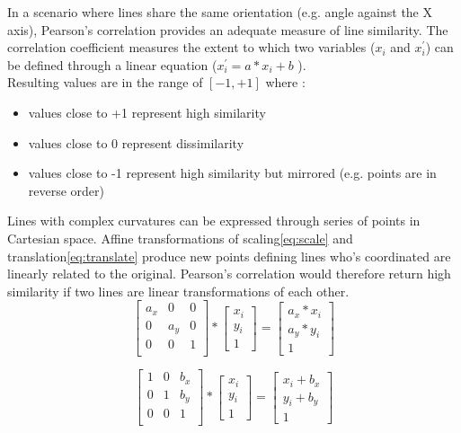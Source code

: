 \documentclass[
    floatsintext
]{article}
\begin{document}
In a scenario where lines share the same orientation (e.g. angle against the X axis), Pearson's correlation provides an adequate measure of line similarity.
The correlation coefficient measures the extent to which two variables ($x_i$ and $x_i^\prime$) 
can be defined through a linear equation ($x_i^\prime = a * x_i + b$ ). \\

Resulting values are in the range of $[-1,+1]$ where :
\begin{itemize}
    \item values close to +1 represent high similarity
    \item values close to 0 represent dissimilarity 
    \item values close to -1 represent high similarity but mirrored (e.g. points are in reverse order) 
\end{itemize}

Lines with complex curvatures can be expressed through series of points in Cartesian space. 
Affine transformations of scaling\eqref{eq:scale} and translation\eqref{eq:translate} produce new points defining lines who's coordinated are linearly related to the original. 
Pearson's correlation would therefore return high similarity if two lines are linear transformations of each other.    
\begin{equation}
  \begin{bmatrix}
    a_x & 0   & 0   \\
    0   & a_y & 0   \\
    0   & 0   &   1 \\ 
  \end{bmatrix} 
  *
  \begin{bmatrix}
    x_i \\ y_i \\ 1
  \end{bmatrix} 
  = 
  \begin{bmatrix}
    a_x * x_i \\ a_y * y_i \\ 1  
  \end{bmatrix}
  \label{eq:scale}
\end{equation}


\begin{equation}
  \begin{bmatrix}
    1 & 0 & b_x \\
    0 & 1 & b_y \\
    0 & 0 & 1   \\ 
  \end{bmatrix} 
  *
  \begin{bmatrix}
    x_i \\ y_i \\ 1
  \end{bmatrix} 
  = 
  \begin{bmatrix}
    x_i + b_x \\ y_i + b_y \\ 1  
  \end{bmatrix}
  \label{eq:translate}
\end{equation}
\end{document}
